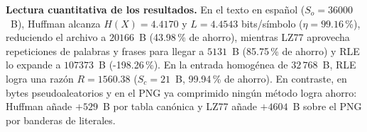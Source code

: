 \noindent\textbf{Lectura cuantitativa de los resultados.} En el texto en español ($S_o=36000$~B), Huffman alcanza $H(X)=4.4170$ y $L=4.4543$ bits/símbolo ($\eta=99.16$\,\%), reduciendo el archivo a $20166$~B (43.98\,\% de ahorro), mientras LZ77 aprovecha repeticiones de palabras y frases para llegar a $5131$~B (85.75\,\% de ahorro) y RLE lo expande a $107373$~B (-198.26\,\%). En la entrada homogénea de $32\,768$~B, RLE logra una razón $R=1560.38$ ($S_c=21$~B, 99.94\,\% de ahorro). En contraste, en bytes pseudoaleatorios y en el PNG ya comprimido ningún método logra ahorro: Huffman añade $+529$~B por tabla canónica y LZ77 añade $+4604$~B sobre el PNG por banderas de literales.\par
